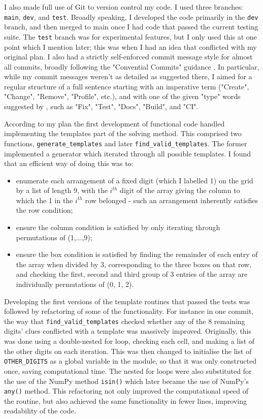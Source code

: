\documentclass[12pt]{article}
\begin{document}
I also made full use of Git to version control my code.
I used three branches: \texttt{main}, \texttt{dev}, and \texttt{test}.
Broadly speaking, I developed the code primarily in the \texttt{dev} branch, and then merged to main once I had code that passed the current testing suite.
The \texttt{test} branch was for experimental features, but I only used this at one point which I mention later; this was when I had an idea that conflicted with my original plan.
I also had a strictly self-enforced commit message style for almost all commits, broadly following the "Convential Commits" guidance \cite{ccommits}.
In particular, while my commit messages weren't as detailed as suggested there, I aimed for a regular structure of a full sentence starting with an imperative term ("Create", "Change", "Remove", "Profile", etc.), and with one of the given "type" words suggested by \cite{ccommits}, such as "Fix", "Test", "Docs", "Build", and "CI".

According to my plan the first development of functional code handled implementing the templates part of the solving method.
This comprised two functions, \texttt{generate\_templates} and later \texttt{find\_valid\_templates}.
The former implemented a generator which iterated through all possible templates. I found that an efficient way of doing this was to:
\begin{itemize}
    \item enumerate each arrangement of a fixed digit (which I labelled 1) on the grid by a list of length 9, with the $i^{th}$ digit of the array giving the column to which the 1 in the $i^{th}$ row belonged - such an arrangement inherently satisfies the row condition;
    \item ensure the column condition is satisfied by only iterating through permutations of (1,...,9);
    \item ensure the box condition is satisfied by finding the remainder of each entry of the array when divided by 3, corresponding to the three boxes on that row, and checking the first, second and third group of 3 entries of the array are individually permutations of (0, 1, 2).
\end{itemize}

Developing the first versions of the template routines that passed the tests was followed by refactoring of some of the functionality.
For instance in one commit, the way that \texttt{find\_valid\_templates} checked whether any of the 8 remaining digits' clues conflicted with a template was massively improved.
Originally, this was done using a double-nested for loop, checking each cell, and making a list of the other digits on each iteration.
This was then changed to initialise the list of \texttt{OTHER\_DIGITS} as a global variable in the module, so that it was only constructed once, saving computational time.
The nested for loops were also substituted for the use of the NumPy method \texttt{isin()} which later became the use of NumPy's \texttt{any()} method.
This refactoring not only improved the computational speed of the routine, but also achieved the same functionality in fewer lines, improving readability of the code.
\end{document}
